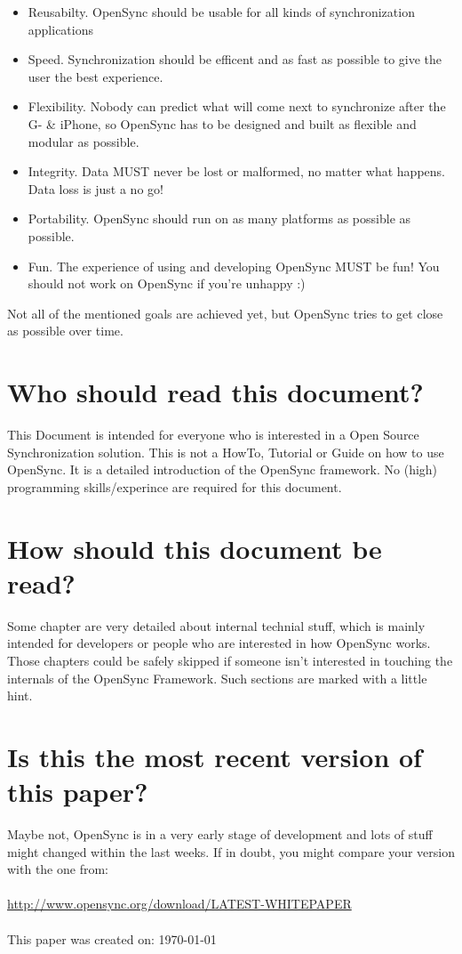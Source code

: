 \begin{itemize}
 \item Reusabilty. OpenSync should be usable for all kinds of synchronization 
 applications
 \item Speed. Synchronization should be efficent and as fast as possible to give the
 user the best experience.
 \item Flexibility. Nobody can predict what will come next to synchronize after the
 G- \& iPhone, so OpenSync has to be designed and built as flexible and modular 
 as possible.
 \item Integrity. Data MUST never be lost or malformed, no matter what happens. 
 Data loss is just a no go!
 \item Portability. OpenSync should run on as many platforms as possible as 
 possible.
 \item Fun. The experience of using and developing OpenSync MUST be fun! You 
 should not work on OpenSync if you're unhappy :)
\end{itemize}
Not all of the mentioned goals are achieved yet, but OpenSync tries to get 
close as possible over time.

\section{Who should read this document?}
This Document is intended for everyone who is interested in a Open Source 
Synchronization solution. This is not a HowTo, Tutorial or Guide on how to use 
OpenSync. It is a detailed introduction of the OpenSync framework. No (high) 
programming skills/experince are required for this document.

\section{How should this document be read?}
Some chapter are very detailed about internal technial stuff, which is mainly 
intended for developers or people who are interested in how OpenSync works. Those
chapters could be safely skipped if someone isn't interested in touching the
internals of the OpenSync Framework. Such sections are marked with a little hint.

\section{Is this the most recent version of this paper?}
Maybe not, OpenSync is in a very early stage of development and lots of stuff
might changed within the last weeks. If in doubt, you might compare your version 
with the one from:\\
\\
\hyperref[http://www.opensync.org/download/LATEST-WHITEPAPER]{http://www.opensync.org/download/LATEST-WHITEPAPER}\\
\\
This paper was created on: \today
